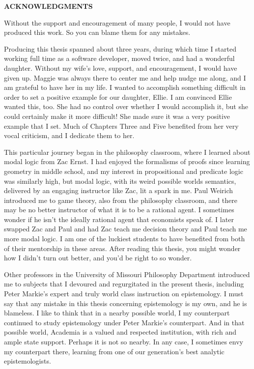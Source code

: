 \newpage
{}
\setcounter{page}{2}

\centerline{\bf \large ACKNOWLEDGMENTS}
\vskip 10mm %
Without the support and encouragement of many people, I would not have produced this work. So you can blame them for any mistakes.

Producing this thesis spanned about three years, during which time I started working full time as a software developer, moved twice, and had a wonderful daughter. Without my wife's love, support, and encouragement, I would have given up. Maggie was always there to center me and help nudge me along, and I am grateful to have her in my life. I wanted to accomplish something difficult in order to set a positive example for our daughter, Ellie. I am convinced Ellie wanted this, too. She had no control over whether I would accomplish it, but she could certainly make it more difficult! She made sure it was a very positive example that I set. Much of Chapters Three and Five benefited from her very vocal criticism, and I dedicate them to her.

This particular journey began in the philosophy classroom, where I learned about modal logic from Zac Ernst. I had enjoyed the formalisms of proofs since learning geometry in middle school, and my interest in propositional and predicate logic was similarly high, but modal logic, with its weird possible worlds semantics, delivered by an engaging instructor like Zac, lit a spark in me. Paul Weirich introduced me to game theory, also from the philosophy classroom, and there may be no better instructor of what it is to be a rational agent. I sometimes wonder if he isn't the ideally rational agent that economists speak of. I later swapped Zac and Paul and had Zac teach me decision theory and Paul teach me more modal logic. I am one of the luckiest students to have benefited from both of their mentorship in these areas. After reading this thesis, you might wonder how I didn't turn out better, and you'd be right to so wonder.

Other professors in the University of Missouri Philosophy Department introduced me to subjects that I devoured and regurgitated in the present thesis, including Peter Markie's expert and truly world class instruction on epistemology. I must say that any mistake in this thesis concerning epistemology is my own, and he is blameless. I like to think that in a nearby possible world, I my counterpart continued to study epistemology under Peter Markie's counterpart. And in that possible world, Academia is a valued and respected institution, with rich and ample state support. Perhaps it is not so nearby. In any case, I sometimes envy my counterpart there, learning from one of our generation's best analytic epistemologists.

